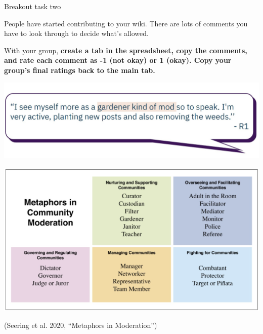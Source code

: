 \documentclass[nobackground,dvipsnames,table]{beamer}
\begin{document}
\begin{frame}{Breakout task two}

People have started contributing to your wiki. There are lots of comments you have to look through to decide what’s allowed.
\newline 

With your group, \textbf{create a tab in the spreadsheet, copy the comments, and rate each comment as -1 (not okay) or 1 (okay). Copy your group’s final ratings back to the main tab.}



\end{frame}

\begin{frame}{}

\includegraphics[width=\textwidth]{img/fig25.jpg}

\end{frame}

\begin{frame}{}

\vspace*{3ex}
\includegraphics[width=\textwidth]{img/fig26.jpg}

\vspace{11ex}
\scriptsize{\color{lightgray}(Seering et al. 2020, “Metaphors in Moderation”)}

\end{frame}

\end{document}
